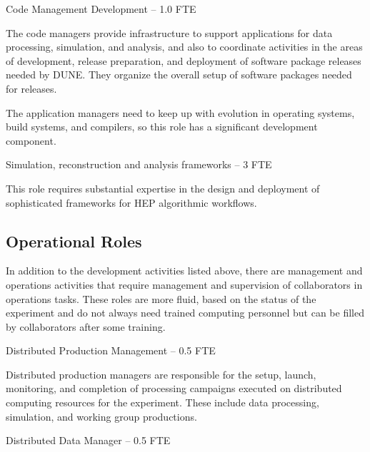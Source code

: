 \documentclass[../main-v1.tex]{subfiles}
\begin{document}
\begin{description}
\item {Code Management Development -- 1.0 FTE}

The code managers provide infrastructure to support applications for  data processing, simulation, and analysis, and also to coordinate activities in the areas of development, release preparation, and %
deployment of software package releases needed by DUNE. They organize the overall setup of software packages needed for releases.

The application managers need to keep up with evolution in operating systems, build systems, and compilers, so this role has a significant development component.

\item{Simulation, reconstruction and analysis frameworks -- 3 FTE}

This role requires substantial expertise in the design and deployment of sophisticated frameworks for HEP algorithmic workflows. 


\subsection{Operational  Roles}
\label{subsec:coll-org:Ops}
In addition to the development activities listed above, there are management and operations activities that require management and supervision of collaborators in operations tasks.   These roles are more fluid, based on the status of the experiment and do not always need trained computing personnel but can be filled by collaborators after some training. 


\item {Distributed Production Management -- 0.5 FTE}

Distributed production managers are responsible for the setup, launch, monitoring, and %
completion of processing campaigns executed on distributed computing resources for the experiment. %
These include data processing,  simulation, and working group productions. 


\item {Distributed Data Manager -- 0.5 FTE}


\end{description}
\end{document}
